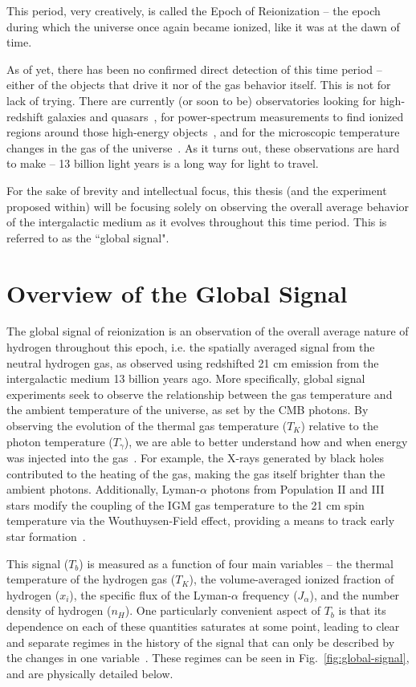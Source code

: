This period, very creatively, is called the Epoch of Reionization -- the epoch 
during which the universe once again became ionized, like it was at the dawn of 
time.

As of yet, there has been no confirmed direct detection of this time period -- 
either of the objects that drive it nor of the gas behavior itself. This is not 
for lack of trying. There are currently (or soon to be) observatories looking 
for high-redshift galaxies and quasars~\citep{gardner2006}, for power-spectrum 
measurements to find ionized regions around those high-energy 
objects~\citep{deboer2017}, and for the microscopic temperature changes in the 
gas of the universe~\citep{bowman2018}.  As it turns out, these observations 
are hard to make -- 13 billion light years is a long way for light to travel.

For the sake of brevity and intellectual focus, this thesis (and the experiment 
proposed within) will be focusing solely on observing the overall average 
behavior of the intergalactic medium as it evolves throughout this time period.  
This is referred to as the ``global signal".

\section{Overview of the Global Signal}

The global signal of reionization is an observation of the overall average 
nature of hydrogen throughout this epoch, i.e. the spatially averaged signal 
from the neutral hydrogen gas, as observed using redshifted 21 cm emission from 
the intergalactic medium 13 billion years ago. More specifically, global signal 
experiments seek to observe the relationship between the gas temperature and 
the ambient temperature of the universe, as set by the CMB photons.  By 
observing the evolution of the thermal gas temperature ($T_K$) relative to the 
photon temperature ($T_\gamma$), we are able to better understand how and when 
energy was injected into the gas~\citep{pritchard-loeb2010}. For example, the 
X-rays generated by black holes contributed to the heating of the gas, making 
the gas itself brighter than the ambient photons. Additionally, Lyman-$\alpha$ 
photons from Population II and III stars modify the coupling of the IGM gas 
temperature to the 21 cm spin temperature via the Wouthuysen-Field effect, 
providing a means to track early star formation~\citep{furlanetto2006}.

This signal ($T_b$) is measured as a function of four main variables -- the 
thermal temperature of the hydrogen gas ($T_K$), the volume-averaged ionized 
fraction of hydrogen ($x_i$), the specific flux of the Lyman-$\alpha$ frequency 
($J_\alpha$), and the number density of hydrogen ($n_H$). One particularly 
convenient aspect of $T_b$ is that its dependence on each of these quantities 
saturates at some point, leading to clear and separate regimes in the history 
of the signal that can only be described by the changes in one 
variable~\citep{pritchard-loeb2012}. These regimes can be seen in 
Fig.~\ref{fig:global-signal}, and are physically detailed below.

